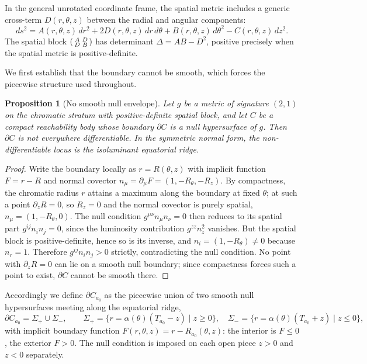 \documentclass[preprint,12pt,authoryear]{elsarticle}
\theoremstyle{plain}
\newtheorem{proposition}[theorem]{Proposition}
\theoremstyle{definition}
\theoremstyle{remark}
\begin{document}
In the general unrotated coordinate frame, the spatial metric includes a generic cross-term $D(r,\theta,z)$ between the radial and angular components:
\[
ds^2
=
A(r,\theta,z)\,dr^2
+2D(r,\theta,z)\,dr\,d\theta
+B(r,\theta,z)\,d\theta^2
-C(r,\theta,z)\,dz^2 .
\]
The spatial block $\begin{psmallmatrix} A & D\\ D & B\end{psmallmatrix}$ has determinant $\Delta=AB-D^2$, positive precisely when the spatial metric is positive-definite.

We first establish that the boundary cannot be smooth, which forces the piecewise structure used throughout.

\begin{proposition}[No smooth null envelope]
\label{prop:no-smooth-null}
Let $g$ be a metric of signature $(2,1)$ on the chromatic stratum with positive-definite spatial block, and let $C$ be a compact reachability body whose boundary $\partial C$ is a null hypersurface of $g$. Then $\partial C$ is not everywhere differentiable. In the symmetric normal form, the non-differentiable locus is the isoluminant equatorial ridge.
\end{proposition}

\begin{proof}
Write the boundary locally as $r=R(\theta,z)$ with implicit function $F=r-R$ and normal covector $n_\mu=\partial_\mu F=(1,-R_\theta,-R_z)$. By compactness, the chromatic radius $r$ attains a maximum along the boundary at fixed $\theta$; at such a point $\partial_z R=0$, so $R_z=0$ and the normal covector is purely spatial, $n_\mu=(1,-R_\theta,0)$. The null condition $g^{\mu\nu}n_\mu n_\nu=0$ then reduces to its spatial part $g^{ij}n_i n_j=0$, since the luminosity contribution $g^{zz}n_z^2$ vanishes. But the spatial block is positive-definite, hence so is its inverse, and $n_i=(1,-R_\theta)\neq 0$ because $n_r=1$. Therefore $g^{ij}n_i n_j>0$ strictly, contradicting the null condition. No point with $\partial_z R=0$ can lie on a smooth null boundary; since compactness forces such a point to exist, $\partial C$ cannot be smooth there.
\end{proof}

Accordingly we define $\partial C_{a_0}$ as the piecewise union of two smooth null hypersurfaces meeting along the equatorial ridge,
\[
\partial C_{a_0}=\Sigma_+\cup\Sigma_-,
\qquad
\Sigma_+=\{r=\alpha(\theta)(T_{a_0}-z)\mid z\geq 0\},
\quad
\Sigma_-=\{r=\alpha(\theta)(T_{a_0}+z)\mid z\leq 0\},
\]
with implicit boundary function $F(r,\theta,z)=r-R_{a_0}(\theta,z)$: the interior is $F\leq 0$, the exterior $F>0$. The null condition is imposed on each open piece $z>0$ and $z<0$ separately.
\end{document}
